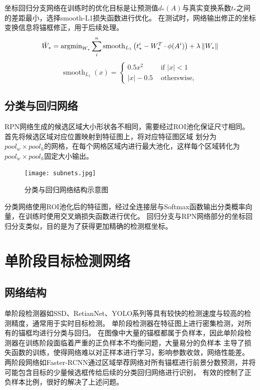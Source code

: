 坐标回归分支网络在训练时的优化目标是让预测值$d_{*}(A)$与真实变换系数$t_{*}$之间的差距最小，选择smooth-L1损失函数进行优化。
在测试时，网络输出修正的坐标变换信息将锚框修正，用于后续处理。
\begin{equation}
  {\hat W_*} = {{\mathop{\rm argmin}\nolimits} _{{W_*}}}\sum\limits_i^n {{{{\mathop{\rm smooth}\nolimits} }_{{L_1}}}
  \left( {t_*^i - W_*^T \cdot \phi ({A^i})} \right)}  + \lambda \left\| {{W_*}} \right\|
  \label{eq:bbox_reg3}
\end{equation}
\begin{equation}
  \operatorname{smooth}_{L_{1}}(x)
  =\left\{\begin{array}{rr} 0.5 x^{2} & \text { if }|x|<1 \\ |x|-0.5 & \text { otherswise, } \end{array}\right.
  \label{eq:bbox_reg4}
\end{equation}

\subsection{分类与回归网络}
RPN网络生成的候选区域大小形状各不相同，需要经过ROI池化保证尺寸相同。首先将候选区域对应位置映射到特征图上，将对应特征图区域
划分为$pool_w \times pool_h$的网格，在每个网格区域内进行最大池化，这样每个区域转化为$pool_w \times pool_h$固定大小输出。

\begin{figure}[htbp]                  
  \centering                   
  \texttt{[image: subnets.jpg]}                   
  \caption{分类与回归网络结构示意图}                   
  \label{fig:subnets}      
\end{figure}   

分类网络使用ROI池化后的特征图，经过全连接层与Softmax函数输出分类概率向量，在训练时使用交叉熵损失函数进行优化。
回归分支与RPN网络部分的坐标回归分支类似，目的是为了获得更加精确的检测框坐标。

\section{单阶段目标检测网络}

\subsection{网络结构}
单阶段检测器如SSD、RetianNet、YOLO系列等具有较快的检测速度与较高的检测精度，通常用于实时目标检测。
单阶段检测器在特征图上进行密集检测，对所有的锚框均进行分类与回归。
在图像中大量的锚框都属于负样本，因此单阶段检测器在训练阶段面临着严重的正负样本不均衡问题，大量易分的负样本
主导了损失函数的训练，使得网络难以对正样本进行学习，影响参数收敛，网络性能差。
两阶段网络如Faster-RCNN通过区域举荐网络对所有锚框进行前景分数预测，并将可能包含目标的少量候选框传给后续的分类回归网络进行识别，
有效的控制了正负样本比例，很好的解决了上述问题。

